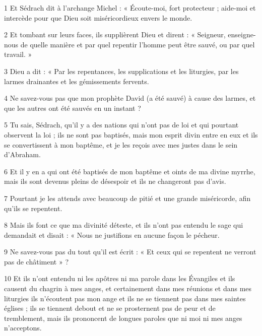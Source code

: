
\par 1 Et Sédrach dit à l'archange Michel : « Écoute-moi, fort protecteur ; aide-moi et intercède pour que Dieu soit miséricordieux envers le monde.

\par 2 Et tombant sur leurs faces, ils supplièrent Dieu et dirent : « Seigneur, enseigne-nous de quelle manière et par quel repentir l'homme peut être sauvé, ou par quel travail. »

\par 3 Dieu a dit : « Par les repentances, les supplications et les liturgies, par les larmes drainantes et les gémissements fervents.

\par 4 Ne savez-vous pas que mon prophète David (a été sauvé) à cause des larmes, et que les autres ont été sauvés en un instant ?

\par 5 Tu sais, Sédrach, qu'il y a des nations qui n'ont pas de loi et qui pourtant observent la loi ; ils ne sont pas baptisés, mais mon esprit divin entre en eux et ils se convertissent à mon baptême, et je les reçois avec mes justes dans le sein d'Abraham.

\par 6 Et il y en a qui ont été baptisés de mon baptême et oints de ma divine myrrhe, mais ils sont devenus pleins de désespoir et ils ne changeront pas d'avis.

\par 7 Pourtant je les attends avec beaucoup de pitié et une grande miséricorde, afin qu'ils se repentent.

\par 8 Mais ils font ce que ma divinité déteste, et ils n'ont pas entendu le sage qui demandait et disait : « Nous ne justifions en aucune façon le pécheur.

\par 9 Ne savez-vous pas du tout qu'il est écrit : « Et ceux qui se repentent ne verront pas de châtiment » ?

\par 10 Et ils n'ont entendu ni les apôtres ni ma parole dans les Évangiles et ils causent du chagrin à mes anges, et certainement dans mes réunions et dans mes liturgies ils n'écoutent pas mon ange et ils ne se tiennent pas dans mes saintes églises ; ils se tiennent debout et ne se prosternent pas de peur et de tremblement, mais ils prononcent de longues paroles que ni moi ni mes anges n'acceptons.

